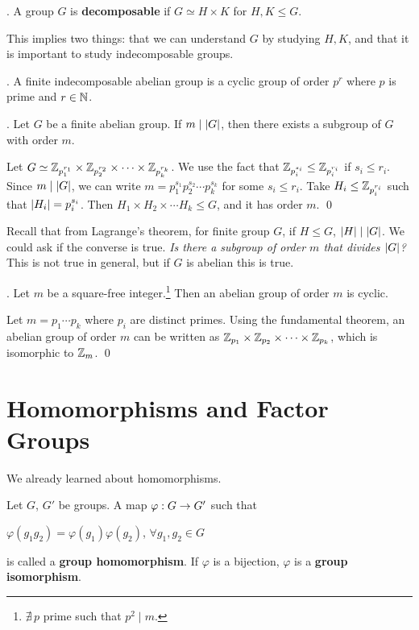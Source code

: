 .  A group \(G\) is \textbf{decomposable} if \(G \simeq H \times K\) for \(H, K \leq G\).

This implies two things: that we can understand \(G\) by studying \(H, K\), and that it is important to study indecomposable groups.

\thm. A finite indecomposable abelian group is a cyclic group of order \(p^r\) where \(p\) is prime and \(r \in \mathbb{N}\).

\thm. Let \(G\) be a finite abelian group. If \(m \mid \left| G \right|\), then there exists a subgroup of \(G\) with order \(m\).

\pf Let \(G \simeq \mathbb{Z}_{p_1^{r_1}} \times \mathbb{Z}_{p_2^{r_2}} \times \cdots \times \mathbb{Z}_{p_k^{r_k}}\). We use the fact that \(\mathbb{Z}_{p_i^{s_i}} \leq \mathbb{Z}_{p_i^{r_i}}\) if \(s_i \leq r_i\). Since \(m \mid \left| G \right|\), we can write \(m = p_1^{s_1}p_2^{s_2} \cdots p_k^{s_k}\) for some \(s_i \leq r_i\). Take \(H_i \leq \mathbb{Z}_{p_i^{r_i}}\) such that \(\left| H_i \right| = p_i^{s_i}\). Then \(H_1 \times H_2 \times \cdots H_k \leq G\), and it has order \(m\). \qed

Recall that from Lagrange's theorem, for finite group \(G\), if \(H \leq G\), \(\left| H \right| \mid \left| G \right|\). We could ask if the converse is true. \textit{Is there a subgroup of order \(m\) that divides \(\left| G \right|\)?} This is not true in general, but if \(G\) is abelian this is true.

\thm. Let \(m\) be a square-free integer.\footnote{\(\nexists\, p\) prime such that \(p^2 \mid m\).} Then an abelian group of order \(m\) is cyclic.

\pf Let \(m = p_1 \cdots p_k\) where \(p_i\) are distinct primes. Using the fundamental theorem, an abelian group of order \(m\) can be written as \(\mathbb{Z}_{p_1} \times \mathbb{Z}_{p_2} \times \cdots \times \mathbb{Z}_{p_k}\), which is isomorphic to \(\mathbb{Z}_m\). \qed

\pagebreak

\setcounter{topic}{12}
\chapter{Homomorphisms and Factor Groups}


We already learned about homomorphisms.

\recall Let \(G\), \(G'\) be groups. A map \(\varphi: G \rightarrow G'\) such that
\begin{center}
    \(\varphi(g_1 g_2) = \varphi(g_1) \varphi(g_2)\), \quad \(\forall g_1, g_2 \in G\)
\end{center}
is called a \textbf{group homomorphism}. If \(\varphi\) is a bijection, \(\varphi\) is a \textbf{group isomorphism}.

